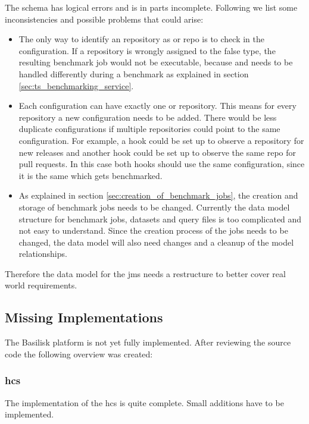 The schema has logical errors and is in parts incomplete.
Following we list some inconsistencies and possible problems that could arise:
\begin{itemize}
	\item The only way to identify an repository as \gh{} or \dockh{} repo is to check in the \ts{} configuration.
		If a repository is wrongly assigned to the false type, the resulting benchmark job would not be executable, because \gh{} and \dockh{} needs to be handled differently during a benchmark as explained in section \ref{sec:ts_benchmarking_service}.
	
	\item Each \ts{} configuration can have exactly one \gh{} or \dockh{} repository.
		This means for every repository a new \ts{} configuration needs to be added.
		There would be less duplicate configurations if multiple repositories could point to the same configuration.
		For example, a hook could be set up to observe a \gh{} repository for new releases and another hook could be set up to observe the same \gh{} repo for pull requests.
		In this case both hooks should use the same \ts{} configuration, since it is the same \ts{} which gets benchmarked.
		
	\item As explained in section \ref{sec:creation_of_benchmark_jobs}, the 	creation and storage of benchmark jobs needs to be changed.
		Currently the data model structure for benchmark jobs, datasets and query files is too complicated and not easy to understand.
		Since the creation process of the jobs needs to be changed, the data model will also need changes and a cleanup of the model relationships.
	
\end{itemize} 

Therefore the data model for the \ac{jms} needs a restructure to better cover real world requirements.


\subsection{Missing Implementations}
\label{sec:review_missing_impl}
The Basilisk platform is not yet fully implemented.
After reviewing the source code the following overview was created:

\subsubsection{\acl{hcs}}
The implementation of the \acl{hcs} is quite complete.
Small additions have to be implemented.

